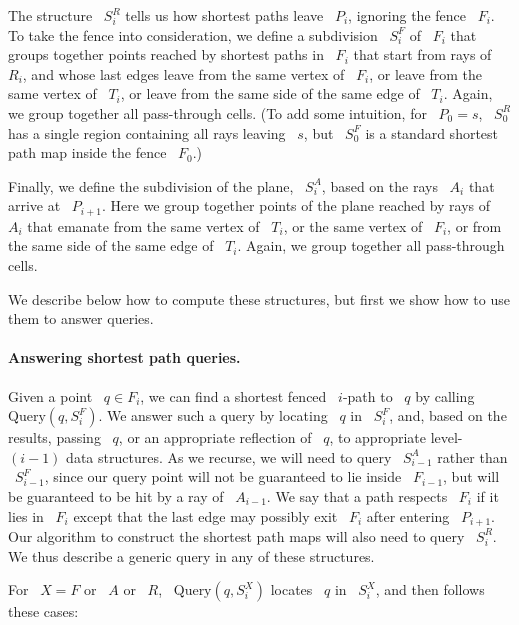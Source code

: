 \documentclass[11pt]{article}
\begin{document}
The structure ~\(S_i^R\) tells us how shortest paths leave ~\(P_i\), ignoring the fence ~\(F_i\).
To take the fence into consideration, we define a subdivision ~\(S_i^F\) of ~\(F_i\) that groups together points reached by shortest paths in ~\(F_i\) that start from rays of ~\(R_i\), and whose last edges leave from the same vertex of ~\(F_i\), or leave from the same vertex of ~\(T_i\), or leave from the same side of the same edge of ~\(T_i\).
Again, we group together all pass-through cells.
(To add some intuition, for ~\(P_0 = s\), ~\(S_0^R\) has a single region containing all rays leaving ~\(s\), but ~\(S_0^F\) is a standard shortest path map inside the fence ~\(F_0\).)

Finally, we define the subdivision of the plane, ~\(S_i^A\), based on the rays ~\(A_i\) that arrive at ~\(P_{i+1}\).
Here we group together points of the plane reached by rays of ~\(A_i\) that emanate from the same vertex of ~\(T_i\), or the same vertex of ~\(F_i\), or from the same side of the same edge of ~\(T_i\).
Again, we group together all pass-through cells.

We describe below how to compute these structures, but first we show how to use them to answer queries.

\paragraph{Answering shortest path queries.}
Given a point ~\(q \in F_i\), we can find a shortest fenced ~\(i\)-path to ~\(q\) by calling ~\(\text{Query}(q, S_i^F)\).
We answer such a query by locating ~\(q\) in ~\(S_i^F\), and, based on the results, passing ~\(q\), or an appropriate reflection of ~\(q\), to appropriate level-~\((i-1)\) data structures.
As we recurse, we will need to query ~\(S_{i-1}^A\) rather than ~\(S_{i-1}^F\), since our query point will not be guaranteed to lie inside ~\(F_{i-1}\), but will be guaranteed to be hit by a ray of ~\(A_{i-1}\).
We say that a path respects ~\(F_i\) if it lies in ~\(F_i\) except that the last edge may possibly exit ~\(F_i\) after entering ~\(P_{i+1}\).
Our algorithm to construct the shortest path maps will also need to query ~\(S_i^R\).
We thus describe a generic query in any of these structures.

For ~\(X = F\) or ~\(A\) or ~\(R\), ~\(\text{Query}(q, S_i^X)\) locates ~\(q\) in ~\(S_i^X\), and then follows these cases:
\end{document}
